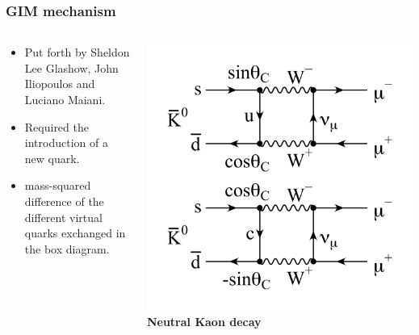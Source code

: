 \documentclass{beamer}
\begin{document}
\begin{frame}
\frametitle{GIM mechanism }
\begin{columns}
	\begin{column}{0.5\textwidth}
		\begin{itemize}
			\item Put forth by  Sheldon Lee Glashow, John Iliopoulos and Luciano Maiani.
			\item Required the introduction of a new quark.
			\item  mass-squared difference of the different virtual quarks exchanged in the box diagram.
			
		\end{itemize}
	\end{column}
	\begin{column}{0.5\textwidth}  %
		\begin{center}			
			\includegraphics[width=1\textwidth, height=.6\textheight]{imagenes/Gim.png}
			\textbf{Neutral Kaon decay}
			 \cite{GIMMechanism}
			\label{fig:GIM}
		\end{center}
	\end{column}
\end{columns}

\end{frame}
\end{document}
